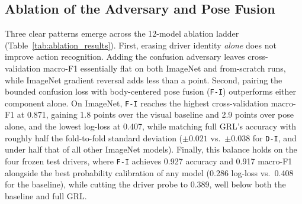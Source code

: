 \begin{table}[t]
  \centering
  \small
  \caption{\textbf{Main ablation results.} Performance across 3-fold driver-grouped cross-validation (mean $\pm$ standard deviation over folds) and a single run on the four frozen test drivers. Models are initialized either from scratch (\texttt{-S}) or from ImageNet weights (\texttt{-I}). Probe is the driver probe defined in Sec.~\ref{sec:experiments}, where lower values indicate less driver identity (cross-validation chance is 0.137).}
  \label{tab:ablation_results}
  \setlength{\tabcolsep}{4pt}
  
\end{table}

\subsection{Ablation of the Adversary and Pose Fusion}
Three clear patterns emerge across the 12-model ablation ladder (Table~\ref{tab:ablation_results}). First, erasing driver identity \emph{alone} does not improve action recognition. Adding the confusion adversary leaves cross-validation macro-F1 essentially flat on both ImageNet and from-scratch runs, while ImageNet gradient reversal adds less than a point. Second, pairing the bounded confusion loss with body-centered pose fusion (\texttt{F-I}) outperforms either component alone. On ImageNet, \texttt{F-I} reaches the highest cross-validation macro-F1 at 0.871, gaining 1.8 points over the visual baseline and 2.9 points over pose alone, and the lowest log-loss at 0.407, while matching full GRL's accuracy with roughly half the fold-to-fold standard deviation ($\pm 0.021$ vs.\ $\pm 0.038$ for \texttt{D-I}, and under half that of all other ImageNet models). Finally, this balance holds on the four frozen test drivers, where \texttt{F-I} achieves 0.927 accuracy and 0.917 macro-F1 alongside the best probability calibration of any model (0.286 log-loss vs.\ 0.408 for the baseline), while cutting the driver probe to 0.389, well below both the baseline and full GRL.

